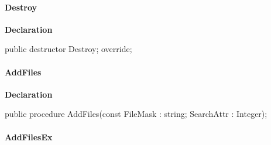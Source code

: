 \documentclass{report}
\newif\ifpdf
\begin{document}
\paragraph*{Destroy}\hspace*{\fill}

\label{AbZipper.TAbCustomZipper-Destroy}
\begin{list}{}{
\setlength{\itemindent}{0cm}
\setlength{\listparindent}{0cm}
\setlength{\leftmargin}{\evensidemargin}
\addtolength{\leftmargin}{\tmplength}
\settowidth{\labelsep}{X}
\addtolength{\leftmargin}{\labelsep}
\setlength{\labelwidth}{\tmplength}
}
\item[\textbf{Declaration}\hfill]
\ifpdf
\begin{flushleft}
\fi
\begin{ttfamily}
public destructor Destroy; override;\end{ttfamily}

\ifpdf
\end{flushleft}
\fi

\end{list}
\paragraph*{AddFiles}\hspace*{\fill}

\label{AbZipper.TAbCustomZipper-AddFiles}
\begin{list}{}{
\setlength{\itemindent}{0cm}
\setlength{\listparindent}{0cm}
\setlength{\leftmargin}{\evensidemargin}
\addtolength{\leftmargin}{\tmplength}
\settowidth{\labelsep}{X}
\addtolength{\leftmargin}{\labelsep}
\setlength{\labelwidth}{\tmplength}
}
\item[\textbf{Declaration}\hfill]
\ifpdf
\begin{flushleft}
\fi
\begin{ttfamily}
public procedure AddFiles(const FileMask : string; SearchAttr : Integer);\end{ttfamily}

\ifpdf
\end{flushleft}
\fi

\end{list}
\paragraph*{AddFilesEx}\hspace*{\fill}
\end{document}
